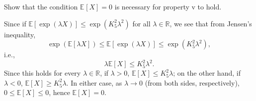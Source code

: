 \begin{problem*}[Exercise 2.5.4]\label{ex2.5.4}
	Show that the condition \(\mathbb{E}_{}[X] = 0\) is necessary for property v to hold.
\end{problem*}
\begin{answer}
	Since if \(\mathbb{E}[\exp (\lambda X)] \leq \exp (K_5^2 \lambda ^2)\) for all \(\lambda \in \mathbb{R} \), we see that from Jensen's inequality,
	\[
		\exp (\mathbb{E}[\lambda X] )
		\leq \mathbb{E}[\exp (\lambda X)]
		\leq \exp (K_5^2 \lambda ^2),
	\]
	i.e.,
	\[
		\lambda \mathbb{E}[X] \leq K_5^2 \lambda ^2.
	\]
	Since this holds for every \(\lambda \in \mathbb{R} \), if \(\lambda > 0\), \(\mathbb{E}[X] \leq K_5^2 \lambda  \); on the other hand, if \(\lambda < 0\), \(\mathbb{E}[X] \geq K_5^2 \lambda \). In either case, as \(\lambda \to 0\) (from both sides, respectively), \(0 \leq \mathbb{E}[X] \leq 0\), hence \(\mathbb{E}[X] = 0\).
\end{answer}

